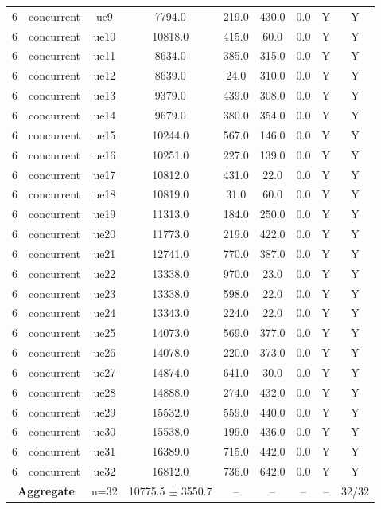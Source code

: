 \begin{table}[ht]
\begin{tabular}{|c|c|c|c|c|c|c|c|c|}
6 & concurrent & ue9 & 7794.0 & 219.0 & 430.0 & 0.0 & Y & Y \\
6 & concurrent & ue10 & 10818.0 & 415.0 & 60.0 & 0.0 & Y & Y \\
6 & concurrent & ue11 & 8634.0 & 385.0 & 315.0 & 0.0 & Y & Y \\
6 & concurrent & ue12 & 8639.0 & 24.0 & 310.0 & 0.0 & Y & Y \\
6 & concurrent & ue13 & 9379.0 & 439.0 & 308.0 & 0.0 & Y & Y \\
6 & concurrent & ue14 & 9679.0 & 380.0 & 354.0 & 0.0 & Y & Y \\
6 & concurrent & ue15 & 10244.0 & 567.0 & 146.0 & 0.0 & Y & Y \\
6 & concurrent & ue16 & 10251.0 & 227.0 & 139.0 & 0.0 & Y & Y \\
6 & concurrent & ue17 & 10812.0 & 431.0 & 22.0 & 0.0 & Y & Y \\
6 & concurrent & ue18 & 10819.0 & 31.0 & 60.0 & 0.0 & Y & Y \\
6 & concurrent & ue19 & 11313.0 & 184.0 & 250.0 & 0.0 & Y & Y \\
6 & concurrent & ue20 & 11773.0 & 219.0 & 422.0 & 0.0 & Y & Y \\
6 & concurrent & ue21 & 12741.0 & 770.0 & 387.0 & 0.0 & Y & Y \\
6 & concurrent & ue22 & 13338.0 & 970.0 & 23.0 & 0.0 & Y & Y \\
6 & concurrent & ue23 & 13338.0 & 598.0 & 22.0 & 0.0 & Y & Y \\
6 & concurrent & ue24 & 13343.0 & 224.0 & 22.0 & 0.0 & Y & Y \\
6 & concurrent & ue25 & 14073.0 & 569.0 & 377.0 & 0.0 & Y & Y \\
6 & concurrent & ue26 & 14078.0 & 220.0 & 373.0 & 0.0 & Y & Y \\
6 & concurrent & ue27 & 14874.0 & 641.0 & 30.0 & 0.0 & Y & Y \\
6 & concurrent & ue28 & 14888.0 & 274.0 & 432.0 & 0.0 & Y & Y \\
6 & concurrent & ue29 & 15532.0 & 559.0 & 440.0 & 0.0 & Y & Y \\
6 & concurrent & ue30 & 15538.0 & 199.0 & 436.0 & 0.0 & Y & Y \\
6 & concurrent & ue31 & 16389.0 & 715.0 & 442.0 & 0.0 & Y & Y \\
6 & concurrent & ue32 & 16812.0 & 736.0 & 642.0 & 0.0 & Y & Y \\
\multicolumn{2}{|c|}{\textbf{Aggregate}} & n=32 & 10775.5 $\pm$ 3550.7 & -- & -- & -- & -- & 32/32 \\

\end{tabular}
\end{table}
